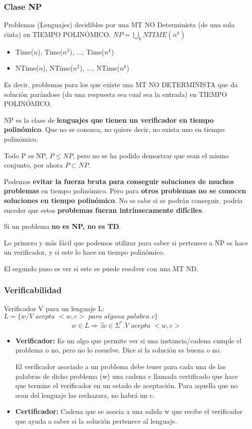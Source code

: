 \subsubsection{Clase NP}
Problemas (Lenguajes) decidibles por una MT NO Determinista (de una sola cinta) en TIEMPO POLINÓMICO. $NP= \bigcup_k NTIME(n^k)$
\begin{itemize}
  \item Time($n$), Time($n^2$), ..., Time($n^k$)
  \item NTime($n$), NTime($n^2$), ..., NTime($n^k$)
\end{itemize}

Es decir, problemas para los que existe una MT NO DETERMINISTA que da solución parándose (da una respuesta sea cual sea la entrada) en TIEMPO POLINÓMICO.

NP es la clase de \textbf{lenguajes que tienen un verificador en tiempo polinómico}. Que no se conozca, no quiere decir, no exista uno en tiempo polinómico.

Todo P es NP, $P \leq NP$, pero no se ha podido demostrar que sean el mismo conjunto, por ahora $P \subset NP$.

Podemos \textbf{evitar la fuerza bruta para conseguir soluciones de muchos problemas} en tiempo polinómico. Pero para \textbf{otros problemas no se conocen soluciones en tiempo polinómico}. No se sabe si se podrán conseguir, podría suceder que estos \textbf{problemas fueran intrínsecamente difíciles}.

Si un problema \textbf{no es NP, no es TD}.

Lo primero y más fácil que podemos utilizar para saber si pertenece a NP es hace un verificador, y si este lo hace en tiempo polinómico.

El segundo paso es ver si este se puede resolver con una MT ND.

\subsubsection{Verificabilidad}
Verificador V para un lenguaje L: $L=\{w / V \textit{ acepta } <w,c> \textit{ para alguna palabra }c\}$
$$w \in L \Rightarrow \exists c \in \Sigma^*. V \textit{ acepta } <w, c>$$
\begin{itemize}
  \item \textbf{Verificador:} Es un algo que permite ver si una instancia/cadena cumple el problema o no, pero no lo resuelve. Dice si la solución es buena o no. 
  
  El verificador asociado a un problema debe tener para cada una de las palabras de dicho problema (w) una cadena c llamada certificado que hace que termine el verificador en un estado de aceptación. Para aquella que no sean del lenguaje las rechazara, no habrá un c.
  \item \textbf{Certificador:} Cadena que se asocia a una salida w que recibe el verificador que ayuda a saber si la solución pertenece al lenguaje.
\end{itemize}


